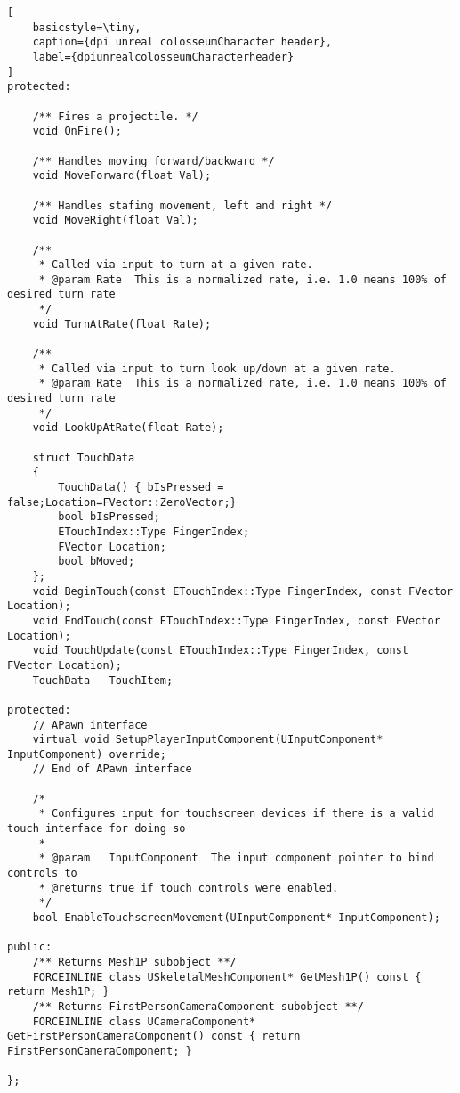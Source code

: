 \begin{lstlisting}[
	basicstyle=\tiny, 
	caption={dpi unreal colosseumCharacter header}, 
	label={dpiunrealcolosseumCharacterheader}
]
protected:
	
	/** Fires a projectile. */
	void OnFire();

	/** Handles moving forward/backward */
	void MoveForward(float Val);

	/** Handles stafing movement, left and right */
	void MoveRight(float Val);

	/**
	 * Called via input to turn at a given rate.
	 * @param Rate	This is a normalized rate, i.e. 1.0 means 100% of desired turn rate
	 */
	void TurnAtRate(float Rate);

	/**
	 * Called via input to turn look up/down at a given rate.
	 * @param Rate	This is a normalized rate, i.e. 1.0 means 100% of desired turn rate
	 */
	void LookUpAtRate(float Rate);

	struct TouchData
	{
		TouchData() { bIsPressed = false;Location=FVector::ZeroVector;}
		bool bIsPressed;
		ETouchIndex::Type FingerIndex;
		FVector Location;
		bool bMoved;
	};
	void BeginTouch(const ETouchIndex::Type FingerIndex, const FVector Location);
	void EndTouch(const ETouchIndex::Type FingerIndex, const FVector Location);
	void TouchUpdate(const ETouchIndex::Type FingerIndex, const FVector Location);
	TouchData	TouchItem;
	
protected:
	// APawn interface
	virtual void SetupPlayerInputComponent(UInputComponent* InputComponent) override;
	// End of APawn interface

	/* 
	 * Configures input for touchscreen devices if there is a valid touch interface for doing so 
	 *
	 * @param	InputComponent	The input component pointer to bind controls to
	 * @returns true if touch controls were enabled.
	 */
	bool EnableTouchscreenMovement(UInputComponent* InputComponent);

public:
	/** Returns Mesh1P subobject **/
	FORCEINLINE class USkeletalMeshComponent* GetMesh1P() const { return Mesh1P; }
	/** Returns FirstPersonCameraComponent subobject **/
	FORCEINLINE class UCameraComponent* GetFirstPersonCameraComponent() const { return FirstPersonCameraComponent; }

};

\end{lstlisting}


